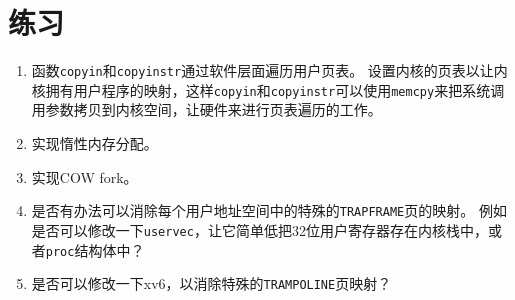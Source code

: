 \section{练习}
\begin{enumerate}
    \item 函数\texttt{copyin}和\texttt{copyinstr}通过软件层面遍历用户页表。
    设置内核的页表以让内核拥有用户程序的映射，这样\texttt{copyin}和\texttt{copyinstr}可以使用\texttt{memcpy}来把系统调用参数拷贝到内核空间，让硬件来进行页表遍历的工作。
    \item 实现惰性内存分配。
    \item 实现COW fork。
    \item 是否有办法可以消除每个用户地址空间中的特殊的\texttt{TRAPFRAME}页的映射。
    例如是否可以修改一下\texttt{uservec}，让它简单低把32位用户寄存器存在内核栈中，或者\texttt{proc}结构体中？
    \item 是否可以修改一下xv6，以消除特殊的\texttt{TRAMPOLINE}页映射？
\end{enumerate}

